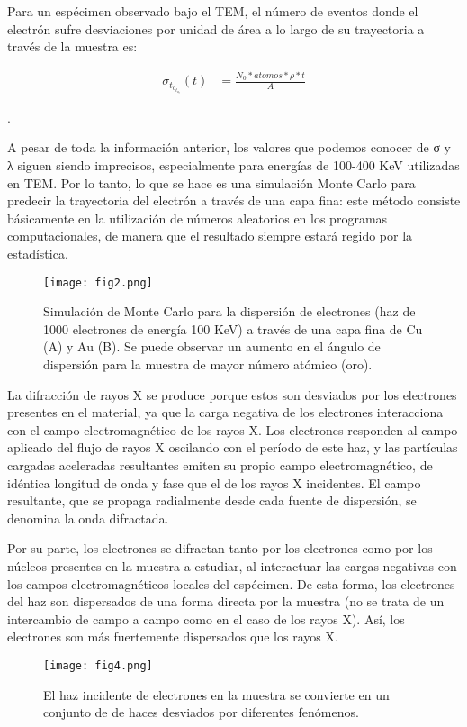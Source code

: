 \documentclass{article}
\begin{document}
Para un espécimen observado bajo el TEM, el número de eventos donde el electrón sufre desviaciones por unidad de área a lo largo de su trayectoria a través de la muestra es:

\begin{align*}
\sigma_t_o_t_a_l(t) &= \frac{N_0*atomos*\rho*t}{A}
\end{align*}




.

A pesar de toda la información anterior, los valores que podemos conocer de σ y λ siguen siendo imprecisos, especialmente para energías de 100-400 KeV utilizadas en TEM. Por lo tanto, lo que se hace es una simulación Monte Carlo para predecir la trayectoria del electrón a través de una capa fina: este método consiste básicamente en la utilización de números aleatorios en los programas computacionales, de manera que el resultado siempre estará regido por la estadística.

\begin{figure} [h!]%
    \centering
    \texttt{[image: fig2.png]} %
    \caption{Simulación de Monte Carlo para la dispersión de electrones (haz de 1000 electrones de energía 100 KeV) a través de una capa fina de Cu (A) y Au (B). Se puede observar un aumento en el ángulo de dispersión para la muestra de mayor número atómico (oro).}
    \label{figura1}
\end{figure}

La difracción de rayos X se produce porque estos son desviados por los electrones presentes en el material, ya que la carga negativa de los electrones interacciona con el campo electromagnético de los rayos X. Los electrones responden al campo aplicado del flujo de rayos X oscilando con el período de este haz, y las partículas cargadas aceleradas resultantes emiten su propio campo electromagnético, de idéntica longitud de onda y fase que el de los rayos X incidentes. El campo resultante, que se propaga radialmente desde cada fuente de dispersión, se denomina la onda difractada.

Por su parte, los electrones se difractan tanto por los electrones como por los núcleos presentes en la muestra a estudiar, al interactuar las cargas negativas con los campos electromagnéticos locales del espécimen. De esta forma, los electrones del haz son dispersados de una forma directa por la muestra (no se trata de un intercambio de campo a campo como en el caso de los rayos X). Así, los electrones son más fuertemente dispersados que los rayos X.

\begin{figure} [ht] %
    \centering
    \texttt{[image: fig4.png]} 
    \caption{El haz incidente de electrones en la muestra se convierte en un conjunto de de haces desviados por diferentes fenómenos.}
    \label{figura1}
\end{figure}




\end{document}

